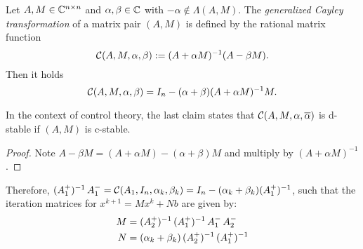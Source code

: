 \begin{lemma}
\label{thm:adi:cayley}
  Let $A, M\in\mathbb{C}^{n\times n}$ and $\alpha, \beta \in\mathbb{C}$ with $-\alpha\notin\Lambda(A, M)$.
  The \emph{generalized Cayley transformation} of a matrix pair $(A,M)$ is defined by
  the rational matrix function
  \begin{equation*}
    \mathcal{C}(A, M, \alpha, \beta) := (A+\alpha M)^{-1} (A-\beta M).
  \end{equation*}
  Then it holds
  \begin{equation*}
    \mathcal{C}(A, M, \alpha, \beta)
    = I_n - (\alpha+\beta) (A+\alpha M)^{-1} M
    .
  \end{equation*}
\end{lemma}
\begin{remark}
  In the context of control theory,
  the last claim states that
  $\Cayley(A, M, \alpha, \conj\alpha)$ is d-stable if
  $(A, M)$ is c-stable.
\end{remark}
\begin{proof}
  Note $A-\beta M = (A+\alpha M) - (\alpha+\beta)M$
  and multiply by $(A+\alpha M)^{-1}$.
\end{proof}

Therefore,
$
  (\mathop{A_1^+})^{-1}\mathop{A_1^-}
  = \mathcal{C}(A_1, I_n, \alpha_k, \beta_k)
  = I_n - (\alpha_k+\beta_k)(\mathop{A_1^+})^{-1}
$,
such that the iteration matrices for $x^{k+1} = M x^k + N b$ are given by:
\begin{equation}
\label{eq:adi:general1step}
  \begin{aligned}
    M &= \mathop{(\mathop{A_2^+})^{-1}} \mathop{(\mathop{A_1^+})^{-1}} \mathop{A_1^-} \mathop{A_2^-} \\
    N &= (\alpha_k + \beta_k) \mathop{(\mathop{A_2^+})^{-1}} \mathop{(\mathop{A_1^+})^{-1}}
  \end{aligned}
\end{equation}

